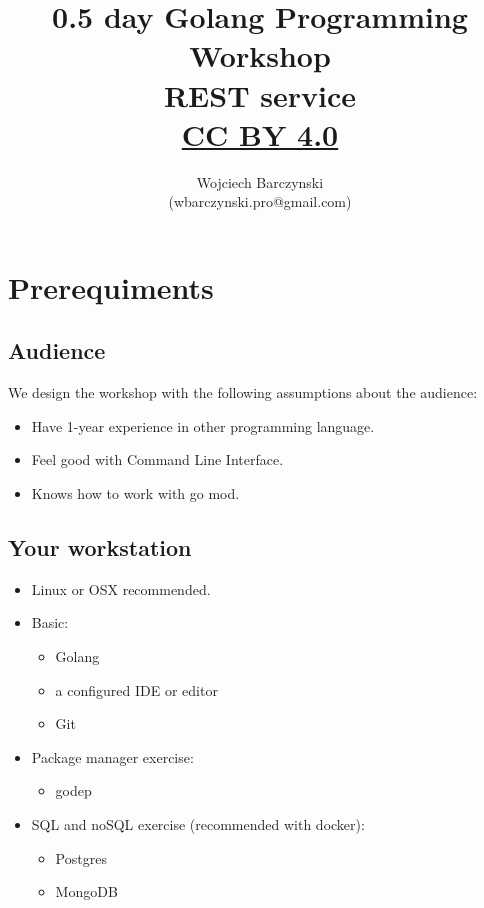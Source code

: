 \documentclass[11pt, letterpaper]{article}
\title{0.5 day Golang Programming Workshop\\{\small REST} service\\{ \small \href{https://creativecommons.org/licenses/by/4.0/}{CC BY 4.0} }  }
\author{Wojciech Barczynski\\(wbarczynski.pro@gmail.com)}
\date{}
\begin{document}

\begin{titlepage}
\maketitle
\end{titlepage}

\tableofcontents
\pagebreak
\section{Prerequiments}

\subsection{Audience}

We design the workshop with the following assumptions about the audience:

\begin{itemize}%
\item Have 1-year experience in other programming language.%
\item Feel good with Command Line Interface.
\item Knows how to work with go mod.
\end{itemize}%

\subsection{Your workstation}

\begin{itemize}%
\item Linux or OSX recommended.%
\item Basic: \begin{itemize}%
    \item Golang
    \item a configured IDE or editor
    \item Git
    \end{itemize}%
\item Package manager exercise:
\begin{itemize}%
    \item godep
    \end{itemize}
\item {\small SQL} and no{\small SQL} exercise (recommended with docker):
\begin{itemize}%
    \item Postgres
    \item MongoDB
\end{itemize}
\end{itemize}
\end{document}
